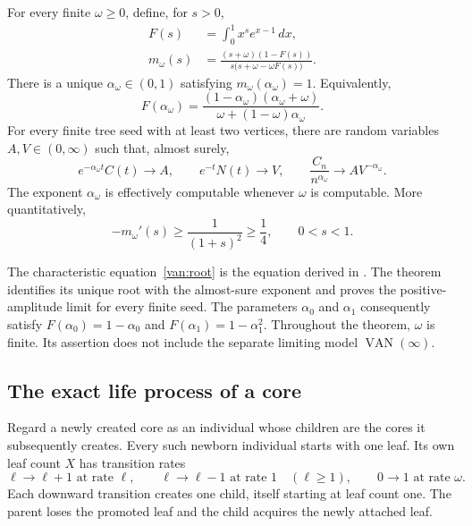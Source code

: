 \begin{theorem}
\label{van:main}
For every finite $\omega\ge0$, define, for $s>0$,
\begin{align}
 F(s)&=\int_0^1 x^s e^{x-1}\,dx,
 \label{van:F}\\
 m_\omega(s)&=
 \frac{(s+\omega)(1-F(s))}
 {s\bigl(s+\omega-\omega F(s)\bigr)}.
 \label{van:m}
\end{align}
There is a unique $\alpha_\omega\in(0,1)$ satisfying
$m_\omega(\alpha_\omega)=1$.  Equivalently,
\begin{equation}
 \boxed{\quad
 F(\alpha_\omega)=
 \frac{(1-\alpha_\omega)(\alpha_\omega+\omega)}
 {\omega+(1-\omega)\alpha_\omega}.
 \quad}
 \label{van:root}
\end{equation}
For every finite tree seed with at least two vertices, there are random
variables $A,V\in(0,\infty)$ such that, almost surely,
\begin{equation}
 e^{-\alpha_\omega t}C(t)\longrightarrow A,
 \qquad e^{-t}N(t)\longrightarrow V,
 \qquad
 \frac{C_n}{n^{\alpha_\omega}}\longrightarrow A V^{-\alpha_\omega}.
 \label{van:limits}
\end{equation}
The exponent $\alpha_\omega$ is effectively computable whenever
$\omega$ is computable.  More quantitatively,
\begin{equation}
 -m_\omega'(s)\ge\frac1{(1+s)^2}\ge\frac14,
 \qquad 0<s<1.
 \label{van:slope}
\end{equation}
\end{theorem}

The characteristic equation~\eqref{van:root} is the equation derived
in \cite[Eq.~(25)]{HRKZ2026}. The theorem identifies its unique root
with the almost-sure exponent and proves the positive-amplitude
limit for every finite seed. The parameters $\alpha_0$ and $\alpha_1$
consequently satisfy
$F(\alpha_0)=1-\alpha_0$ and $F(\alpha_1)=1-\alpha_1^2$.
Throughout the theorem, $\omega$ is finite.  Its assertion does not
include the separate limiting model $\operatorname{VAN}(\infty)$.

\subsection{The exact life process of a core}

Regard a newly created core as an individual whose children are the
cores it subsequently creates.  Every such newborn individual starts
with one leaf.  Its own leaf count $X$ has transition rates
\begin{equation}
 \ell\longrightarrow\ell+1 \text{ at rate }\ell,\qquad
 \ell\longrightarrow\ell-1 \text{ at rate }1
 \quad(\ell\ge1),\qquad
 0\longrightarrow1 \text{ at rate }\omega.
 \label{van:life}
\end{equation}
Each downward transition creates one child, itself starting at leaf
count one.  The parent loses the promoted leaf and the child acquires
the newly attached leaf.

